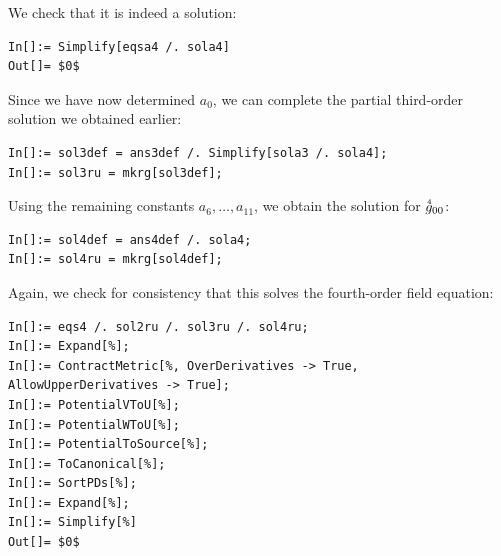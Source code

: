 \documentclass[notitlepage,a4paper,aps,prd,onecolumn,superscriptaddress,nofootinbib,groupedaddress,longbibliography]{revtex4-1}
\newcommand{\order}[2]{\accentset{#2}{#1}}
\begin{document}
We check that it is indeed a solution:
\begin{lstlisting}
In[]:= Simplify[eqsa4 /. sola4]
Out[]= $0$
\end{lstlisting}
Since we have now determined \(a_0\), we can complete the partial third-order solution we obtained earlier:
\begin{lstlisting}
In[]:= sol3def = ans3def /. Simplify[sola3 /. sola4];
In[]:= sol3ru = mkrg[sol3def];
\end{lstlisting}
Using the remaining constants \(a_6, \ldots, a_{11}\), we obtain the solution for \(\order{g}{4}_{00}\):
\begin{lstlisting}
In[]:= sol4def = ans4def /. sola4;
In[]:= sol4ru = mkrg[sol4def];
\end{lstlisting}
Again, we check for consistency that this solves the fourth-order field equation:
\begin{lstlisting}
In[]:= eqs4 /. sol2ru /. sol3ru /. sol4ru;
In[]:= Expand[%];
In[]:= ContractMetric[%, OverDerivatives -> True, AllowUpperDerivatives -> True];
In[]:= PotentialVToU[%];
In[]:= PotentialWToU[%];
In[]:= PotentialToSource[%];
In[]:= ToCanonical[%];
In[]:= SortPDs[%];
In[]:= Expand[%];
In[]:= Simplify[%]
Out[]= $0$
\end{lstlisting}
\end{document}
